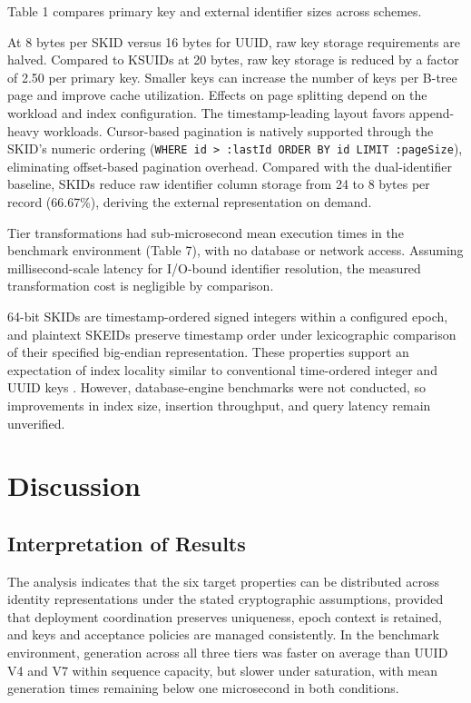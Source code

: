\documentclass[a4paper,fleqn]{cas-sc}
\begin{document}
Table 1 compares primary key and external identifier sizes across
schemes.

At 8 bytes per SKID versus 16 bytes for UUID, raw key storage
requirements are halved. Compared to KSUIDs at 20 bytes, raw key storage
is reduced by a factor of 2.50 per primary key. Smaller keys can
increase the number of keys per B-tree page and improve cache
utilization. Effects on page splitting depend on the workload and index
configuration. The timestamp-leading layout favors append-heavy
workloads. Cursor-based pagination is natively supported through the
SKID's numeric ordering
(\texttt{WHERE\ id\ \textgreater{}\ :lastId\ ORDER\ BY\ id\ LIMIT\ :pageSize}),
eliminating offset-based pagination overhead. Compared with the
dual-identifier baseline, SKIDs reduce raw identifier column storage
from 24 to 8 bytes per record (66.67\%), deriving the external
representation on demand.

Tier transformations had sub-microsecond mean execution times in the
benchmark environment (Table 7), with no database or network access.
Assuming millisecond-scale latency for I/O-bound identifier resolution,
the measured transformation cost is negligible by comparison.

64-bit SKIDs are timestamp-ordered signed integers within a configured
epoch, and plaintext SKEIDs preserve timestamp order under lexicographic
comparison of their specified big-endian representation. These
properties support an expectation of index locality similar to
conventional time-ordered integer and UUID keys \citep[Sections 2.1 and
6.11]{rfc9562}. However, database-engine benchmarks were not conducted,
so improvements in index size, insertion throughput, and query latency
remain unverified.

\section{Discussion}\label{discussion}

\subsection{Interpretation of Results}\label{interpretation-of-results}

The analysis indicates that the six target properties can be distributed
across identity representations under the stated cryptographic
assumptions, provided that deployment coordination preserves uniqueness,
epoch context is retained, and keys and acceptance policies are managed
consistently. In the benchmark environment, generation across all three
tiers was faster on average than UUID V4 and V7 within sequence
capacity, but slower under saturation, with mean generation times
remaining below one microsecond in both conditions.
\end{document}
